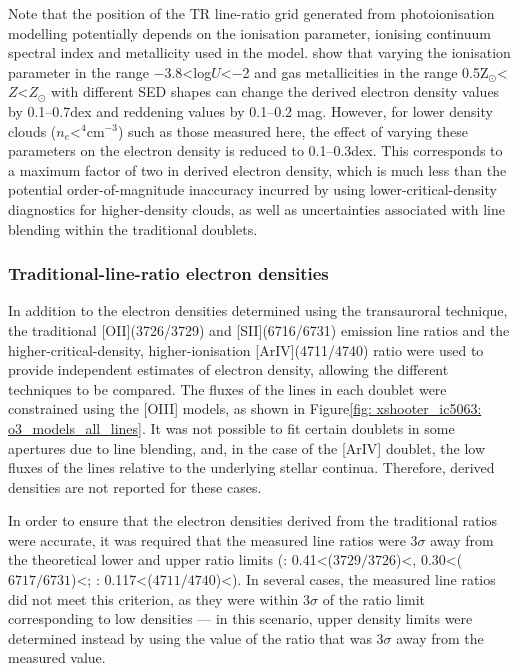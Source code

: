 Note that the position of the TR line-ratio grid generated from photoionisation modelling potentially depends on the ionisation parameter, ionising continuum spectral index and metallicity used in the model. \citet{Santoro2020} show that varying the ionisation parameter in the range \mbox{$-$3.8\;\textless\;log$U$\;\textless\;$-$2} and gas metallicities in the range \mbox{0.5\;Z$_\odot$\;\textless\;$Z$\;\textless{}\;$Z_\odot$} with different SED shapes can change the derived electron density values by 0.1--0.7\;dex and reddening values by 0.1--0.2 mag. However, for lower density clouds ($n_e$\;\mbox{\textless{}$^4$\;cm$^{-3}$}) such as those measured here, the effect of varying these parameters on the electron density is reduced to 0.1--0.3\;dex. This corresponds to a maximum factor of two in derived electron density, which is much less than the potential order-of-magnitude inaccuracy incurred by using lower-critical-density diagnostics for higher-density clouds, as well as uncertainties associated with line blending within the traditional doublets.

\subsubsection{Traditional-line-ratio electron densities}
\label{section: xshooter_ic5063: properties_of_outflowing_gas: uvb_vis_analysis_and_results: trad_densities}

In addition to the electron densities determined using the transauroral technique, the traditional [OII](3726/3729) and [SII](6716/6731) emission line ratios and the higher-critical-density, higher-ionisation [ArIV](4711/4740) ratio were used to provide independent estimates of electron density, allowing the different techniques to be compared. The fluxes of the lines in each doublet were constrained using the [OIII] models, as shown in Figure\;\ref{fig: xshooter_ic5063: o3_models_all_lines}. It was not possible to fit certain doublets in some apertures due to line blending, and, in the case of the [ArIV] doublet, the low fluxes of the lines relative to the underlying stellar continua. Therefore, derived densities are not reported for these cases.

In order to ensure that the electron densities derived from the traditional ratios were accurate, it was required that the measured line ratios were 3$\sigma$ away from the theoretical lower and upper ratio limits (\citealt{Osterbrock2006}: \mbox{0.41\;\textless\;[OII]($3729/3726$)\;\textless{}}, \mbox{0.30\;\textless\;[SII]($6717/6731$)\;\textless{}}; \citealt{Wang2004}: \mbox{0.117\;\textless\;[ArIV]($4711/4740$)\textless{}}). In several cases, the measured line ratios did not meet this criterion, as they were within $3\sigma$ of the ratio limit corresponding to low densities --- in this scenario, upper density limits were determined instead by using the value of the ratio that was $3\sigma$ away from the measured value.


